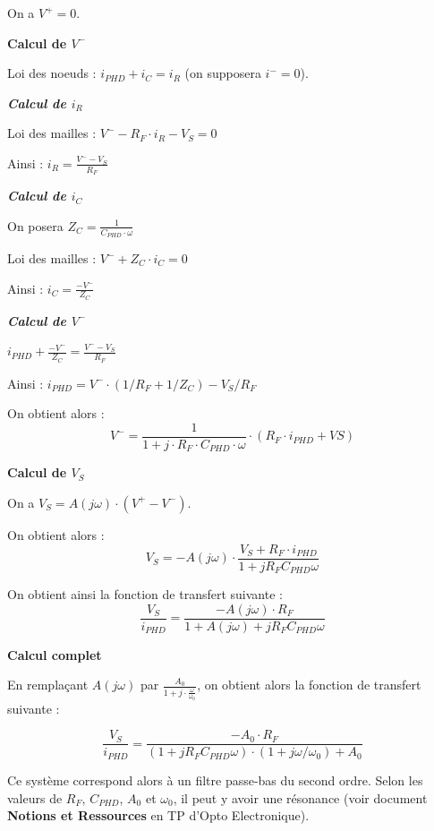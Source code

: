 On a $V^+ = 0$.

\textbf{Calcul de $V^-$}

Loi des noeuds : $i_{PHD} + i_C = i_R$  (on supposera $i^- = 0$).

\textit{\textbf{Calcul de $i_R$}}

Loi des mailles : $V^- - R_F \cdot i_R - V_S = 0$

Ainsi : $\boxed{i_R = \frac{V^- - V_S}{R_F}}$

\textit{\textbf{Calcul de $i_C$}}

On posera $Z_C = \frac{1}{C_{PHD} \cdot \omega}$

Loi des mailles :  $V^- + Z_C \cdot i_C = 0$

Ainsi : $\boxed{i_C = \frac{-V^-}{Z_C}}$

\textit{\textbf{Calcul de $V^-$}}

$i_{PHD} + \frac{-V^-}{Z_C} = \frac{V^- - V_S}{R_F}$

Ainsi : $i_{PHD} = V^- \cdot (1/R_F + 1/Z_C) - V_S/R_F$

On obtient alors : $$\boxed{V^- = \frac{1}{1 + j \cdot R_F \cdot C_{PHD} \cdot \omega} \cdot (R_F \cdot i_{PHD} + VS)}$$

\textbf{Calcul de $V_S$}

On a $V_S = A(j\omega) \cdot (V^+ - V^-)$.

On obtient alors : $$V_S = - A(j\omega) \cdot \frac{V_S + R_F \cdot i_{PHD}}{1 + j R_F C_{PHD} \omega}$$

On obtient ainsi la fonction de transfert suivante : 
$$\boxed{\frac{V_S}{i_{PHD}} = \frac{- A(j\omega) \cdot R_F}{1 + A(j\omega) + j R_F C_{PHD} \omega}}$$

\textbf{Calcul complet}

En remplaçant $A(j\omega)$ par $\frac{A_0}{1 + j \cdot \frac{\omega}{\omega_0}}$, on obtient alors la fonction de transfert suivante :

$$\boxed{\frac{V_S}{i_{PHD}} = \frac{- A_0 \cdot R_F}{(1 + j R_F C_{PHD} \omega) \cdot (1 + j \omega/\omega_0) + A_0}}$$

\bigskip

Ce système correspond alors à un filtre passe-bas du second ordre. Selon les valeurs de $R_F$, $C_{PHD}$, $A_0$ et $\omega_0$, il peut y avoir une résonance (voir document \textbf{Notions et Ressources} en TP d'Opto Electronique).

